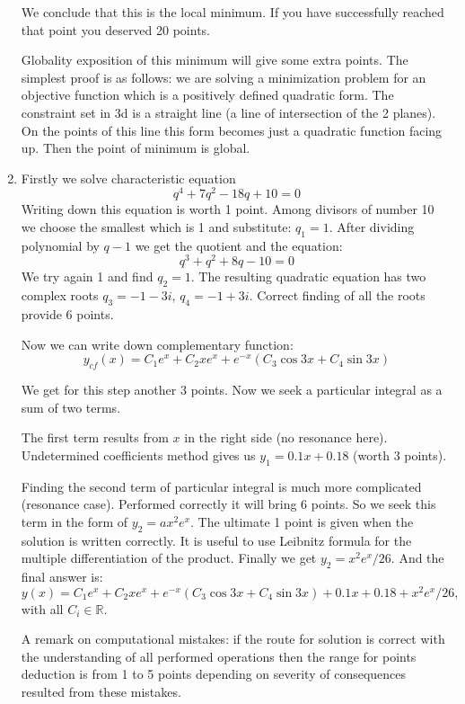 \documentclass[12pt]{article} %
\theoremstyle{definition} %
\begin{document}
\begin{enumerate}[resume]
We conclude that this is the local minimum. 
If you have successfully reached that point you deserved 20 points. 


Globality exposition of this minimum will give some extra points. 
The simplest proof is as follows: we are solving a minimization problem 
for an objective function which is a positively defined quadratic form. 
The constraint set in 3d is a straight line (a line of intersection of the 2 planes). 
On the points of this line this form becomes just a quadratic function facing up. 
Then the point of minimum is global.

\item Firstly we solve characteristic equation 
\[
  q^4 + 7q^2 -18q +10=0  
\] 
Writing down this equation is worth 1 point. 
Among divisors of number 10 we choose the smallest which is 1 and substitute: $q_1 =1$. 
After dividing polynomial by $q-1$ we get the quotient and the equation:
\[
  q^3 +q^2 + 8q -10=0  
\]
We try again 1 and find $q_2 = 1$. 
The resulting quadratic equation has two complex roots $q_3 = -1 -3i$, $q_4 = -1+3i$. 
Correct finding of all the roots provide 6 points. 


Now  we can write down complementary function:
\[
y_{cf}(x) = C_1 e^x + C_2 x e^x + e^{-x}(C_3 \cos 3x + C_4 \sin 3x)
\]

We get for this step another 3 points. 
Now we seek a particular integral as a sum of two terms. 

The first term results from $x$ in the right side (no resonance here). 
Undetermined coefficients method gives us $y_1 = 0.1x + 0.18$ (worth 3 points). 

Finding the second term of particular integral is much more complicated (resonance case). 
Performed correctly it will bring 6 points. So we seek this term in the form of $y_2 =ax^2 e^x$.
 The ultimate 1 point is given when the solution is written correctly. 
It is useful to use Leibnitz formula for the multiple differentiation of the product. 
Finally we get $y_2 = x^2 e^x /26$. And the final answer is:
\[
y(x) = C_1 e^x + C_2 x e^x + e^{-x}(C_3 \cos 3x + C_4 \sin 3x) + 0.1x + 0.18 +  x^2 e^x /26,
\]
with all $C_i \in \mathbb{R}$.

A remark on computational mistakes: 
if the route for solution is correct with the understanding of all performed operations 
then the range for points deduction is from 1 to 5 points 
depending on severity of consequences resulted from these mistakes.
\end{enumerate}
\end{document}
